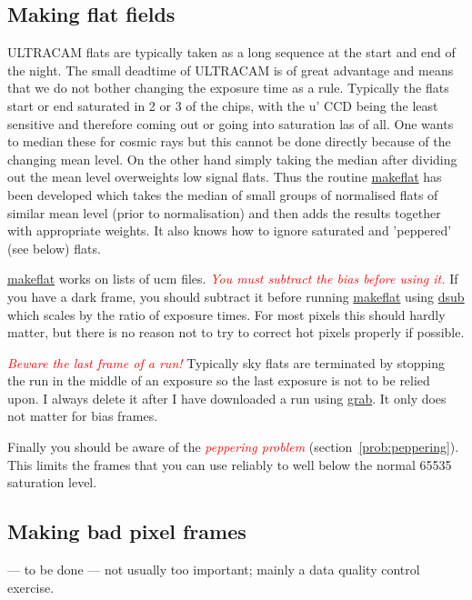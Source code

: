 \documentclass[10pt,a4paper,twocolumn]{article}
\newcommand{\main}{http://quetzel.csc.warwick.ac.uk/phsaap/software}
\newcommand{\ultracam}{\main/ultracam/html}
\newcommand{\warn}[1]{\textcolor{red}{\emph{#1}}}
\begin{document}
\subsection{Making flat fields}

ULTRACAM flats are typically taken as a long sequence at the start and end of
the night. The small deadtime of ULTRACAM is of great advantage and means that
we do not bother changing the exposure time as a rule. Typically the flats start
or end saturated in 2 or 3 of the chips, with the u' CCD being the least
sensitive and therefore coming out or going into saturation las of all. One
wants to median these for cosmic rays but this cannot be done directly because
of the changing mean level. On the other hand simply taking the median after
dividing out the mean level overweights low signal flats. Thus the routine
\href{\ultracam/makeflat.html}{makeflat} has been developed which takes the
median of small groups of normalised flats of similar mean level (prior to
normalisation) and then adds the results together with appropriate weights.
It also knows how to ignore saturated and 'peppered' (see below) flats.

\href{\ultracam/makeflat.html}{makeflat} works on lists of ucm files. 
\warn{You must subtract the bias before using it.} If you have a dark frame,
you should subtract it before running \href{\ultracam/makeflat.html}{makeflat} 
using \href{\ultracam/dsub.html}{dsub} which scales by the ratio of 
exposure times. For most pixels this should hardly matter, but there is no
reason not to try to correct hot pixels properly if possible.

\warn{Beware the last frame of a run!} Typically sky flats are terminated by
stopping the run in the middle of an exposure so the last exposure is
not to be relied upon. I always delete it after I have downloaded a run using 
\href{\ultracam/grab.html}{grab}. It only does not matter for bias frames.

Finally you should be aware of the \warn{peppering problem}
(section~\ref{prob:peppering}). This limits the frames that you can
use reliably to well below the normal 65535 saturation level.

\subsection{Making bad pixel frames}

 --- to be done --- not usually too important; mainly a data quality control
exercise.
\end{document}
